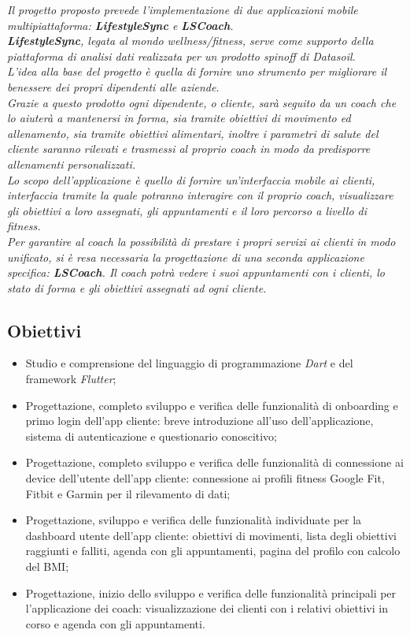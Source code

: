 \textit{
Il progetto proposto prevede l’implementazione di due applicazioni mobile multipiattaforma: \textbf{Lifestyle\textbf{Syn}c} e \textbf{LSCoach}.\\
\textbf{Lifestyle\textbf{Syn}c}, legata al mondo wellness/fitness, serve come supporto della piattaforma di analisi dati realizzata per un prodotto spinoff di Datasoil. \\
L'idea alla base del progetto è quella di fornire uno strumento per migliorare il benessere dei propri dipendenti alle aziende.\\
Grazie a questo prodotto ogni dipendente, o cliente, sarà seguito da un coach che lo aiuterà a mantenersi in forma, sia tramite obiettivi di movimento ed allenamento, sia tramite obiettivi alimentari, inoltre i parametri di salute del cliente saranno rilevati e trasmessi al proprio coach in modo da predisporre allenamenti personalizzati. \\
Lo scopo dell'applicazione è quello di fornire un'interfaccia mobile ai clienti, interfaccia tramite la quale potranno interagire con il proprio coach, visualizzare gli obiettivi a loro assegnati, gli appuntamenti e il loro percorso a livello di fitness.\\
Per garantire al coach la possibilità di prestare i propri servizi ai clienti in modo unificato, si è resa necessaria la progettazione di una seconda applicazione specifica: \textbf{LSCoach}. Il coach potrà vedere i suoi appuntamenti con i clienti, lo stato di forma e gli obiettivi assegnati ad ogni cliente.
}

\subsection{Obiettivi}
\begin{itemize}
    \item Studio e comprensione del linguaggio di programmazione \textit{Dart} e del framework \textit{Flutter};
    \item Progettazione, completo sviluppo e verifica delle funzionalità di onboarding e primo login dell'app cliente: breve introduzione all'uso dell'applicazione, sistema di autenticazione e questionario conoscitivo;
    \item Progettazione, completo sviluppo e verifica delle funzionalità di connessione ai device dell'utente dell'app cliente: connessione ai profili fitness Google Fit, Fitbit e Garmin per il rilevamento di dati;
    \item Progettazione, sviluppo e verifica delle funzionalità individuate per la dashboard utente dell'app cliente: obiettivi di movimenti, lista degli obiettivi raggiunti e falliti, agenda con gli appuntamenti, pagina del profilo con calcolo del \gls{BMI};
    \item Progettazione, inizio dello sviluppo e verifica delle funzionalità principali per l'applicazione dei coach: visualizzazione dei clienti con i relativi obiettivi in corso e agenda con gli appuntamenti.
\end{itemize}

